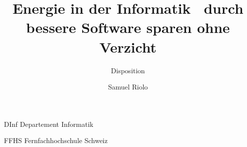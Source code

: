 \documentclass{../template/ffhsthesis}
\begin{document}

\title{Energie in der Informatik \textendash\ durch bessere Software sparen ohne Verzicht}
\subtitle{Disposition} %
\author{Samuel Riolo}


\maketitle



\tableofcontents


\begin{abkuerzungen}[MUSTER] %
\item[DInf] Departement Informatik
\item[FFHS] Fernfachhochschule Schweiz
\end{abkuerzungen}


\startThesis %


\addtolength{\parskip}{\baselineskip}
\parindent 0pt 












\cite[p. 2] {small}
\cite[p. 2] {test}
\cite[p. 2] {sam}




\end{document}
